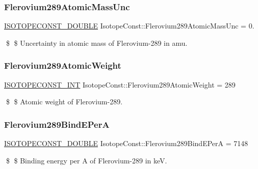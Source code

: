 \subsubsection{\texorpdfstring{Flerovium289\+Atomic\+Mass\+Unc}{Flerovium289AtomicMassUnc}}
{\footnotesize\ttfamily \mbox{\hyperlink{group___isotope_const-_macros_ga8f45a7272ce02c0b4c65c44636ed719a}{I\+S\+O\+T\+O\+P\+E\+C\+O\+N\+S\+T\+\_\+\+D\+O\+U\+B\+LE}} Isotope\+Const\+::\+Flerovium289\+Atomic\+Mass\+Unc = 0.}

\$ \$ Uncertainty in atomic mass of Flerovium-\/289 in amu. \mbox{\label{group___isotope_const-_flerovium-_fl289_ga255f06df97078b73a0216a0da310fd1e}} 
\subsubsection{\texorpdfstring{Flerovium289\+Atomic\+Weight}{Flerovium289AtomicWeight}}
{\footnotesize\ttfamily \mbox{\hyperlink{group___isotope_const-_macros_ga5f18360b3e99483a35c32d789e62621c}{I\+S\+O\+T\+O\+P\+E\+C\+O\+N\+S\+T\+\_\+\+I\+NT}} Isotope\+Const\+::\+Flerovium289\+Atomic\+Weight = 289}

\$ \$ Atomic weight of Flerovium-\/289. \mbox{\label{group___isotope_const-_flerovium-_fl289_ga815944307e36235fe462ea93ba6328ba}} 
\subsubsection{\texorpdfstring{Flerovium289\+Bind\+E\+PerA}{Flerovium289BindEPerA}}
{\footnotesize\ttfamily \mbox{\hyperlink{group___isotope_const-_macros_ga8f45a7272ce02c0b4c65c44636ed719a}{I\+S\+O\+T\+O\+P\+E\+C\+O\+N\+S\+T\+\_\+\+D\+O\+U\+B\+LE}} Isotope\+Const\+::\+Flerovium289\+Bind\+E\+PerA = 7148}

\$ \$ Binding energy per A of Flerovium-\/289 in keV. \mbox{\label{group___isotope_const-_flerovium-_fl289_ga75710d41e705255c9caad4862abdda4e}} 
